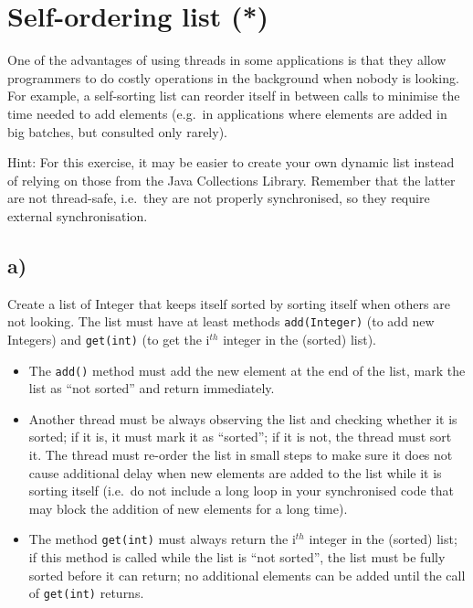 \documentclass{article}
\begin{document}
\section{Self-ordering list (*)}
\label{sec:self-ordering-list}

One of the advantages of using threads in some applications is that
they allow programmers to do costly operations in the background when
nobody is looking. For example, a self-sorting list can reorder itself
in between calls to minimise the time needed to add elements (e.g.~in
applications where elements are added in big batches, but consulted
only rarely).

Hint: For this exercise, it may be easier to create your own dynamic
list instead of relying on those from the Java Collections
Library. Remember that the latter are not thread-safe, i.e.~they are
not properly synchronised, so they require external synchronisation. 

\subsection{a)}

Create a list of Integer that keeps itself sorted by sorting itself
when others are not looking. The list must have at least methods
\verb+add(Integer)+ (to add new Integers) and \verb+get(int)+ (to get
the i$^{th}$ integer in the (sorted) list). 

\begin{itemize}
\item The \verb+add()+ method must add the new element at the end
  of the list, mark the list as ``not sorted'' and return immediately.
\item Another thread must be always observing the list and checking whether
  it is sorted; if it is, it must mark it as ``sorted''; if it is
  not, the thread must sort it. The thread must re-order 
  the list in small steps
  to make sure it does not cause additional delay when new elements
  are added to the list while it is sorting itself (i.e.~do not
  include a long loop in your synchronised code that may block the
  addition of new elements for a long time).
\item The method \verb+get(int)+ must always return the i$^{th}$
  integer in the (sorted) list; if this method is called while the
  list is ``not sorted'', the list must be fully sorted before it can
  return; no additional elements can be added until the call of
  \verb+get(int)+ returns.
\end{itemize}
\end{document}

